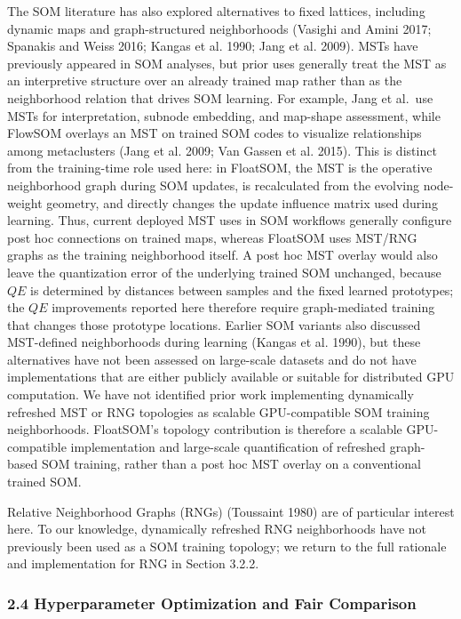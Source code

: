 \documentclass[
]{article}
\providecommand{\DIFadd}[1]{{\protect\color{blue} #1}} %
\providecommand{\DIFaddbegin}{} %
\providecommand{\DIFaddend}{} %
\begin{document}
The SOM literature has also explored alternatives to fixed lattices,
including dynamic maps and graph-structured neighborhoods (Vasighi and
Amini 2017; Spanakis and Weiss 2016; Kangas et al. 1990; Jang et al.
2009).  \DIFaddbegin \DIFadd{MSTs have previously appeared in SOM analyses, but prior uses
generally treat the MST as an interpretive structure over an already
trained map rather than as the neighborhood relation that drives SOM
learning. For example, Jang et al.~use MSTs for interpretation, subnode
embedding, and map-shape assessment, while FlowSOM overlays an MST on
trained SOM codes to visualize relationships among metaclusters (Jang et
al. 2009; Van Gassen et al. 2015). This is distinct from the
training-time role used here: in FloatSOM, the MST is the operative
neighborhood graph during SOM updates, is recalculated from the evolving
node-weight geometry, and directly changes the update influence matrix
used during learning. Thus, current deployed MST uses in SOM workflows
generally configure post hoc connections on trained maps, whereas
FloatSOM uses MST/RNG graphs as the training neighborhood itself. A post
hoc MST overlay would also leave the quantization error of the
underlying trained SOM unchanged, because \(QE\) is determined by
distances between samples and the fixed learned prototypes; the \(QE\)
improvements reported here therefore require graph-mediated training
that changes those prototype locations. Earlier SOM variants also
discussed MST-defined neighborhoods during learning (Kangas et al.
1990), but }\DIFaddend these alternatives have not been assessed on large-scale
datasets and do not have implementations that are either publicly
available or suitable for distributed GPU computation.  \DIFaddbegin \DIFadd{We have not
identified prior work implementing dynamically refreshed MST or RNG
topologies as scalable GPU-compatible SOM training neighborhoods.
FloatSOM's topology contribution is therefore a scalable GPU-compatible
implementation and large-scale quantification of refreshed graph-based
SOM training, rather than a post hoc MST overlay on a conventional
trained SOM.
}\DIFaddend

Relative Neighborhood Graphs (RNGs) (Toussaint 1980) are of particular
interest  \DIFaddbegin \DIFadd{here. To our knowledge, dynamically refreshed RNG neighborhoods
have not previously been used as a SOM training topology}\DIFaddend ; we return to
the full rationale and implementation for RNG in Section 3.2.2.

\subsubsection{2.4 Hyperparameter Optimization and Fair
Comparison}\label{hyperparameter-optimization-and-fair-comparison}
\end{document}

